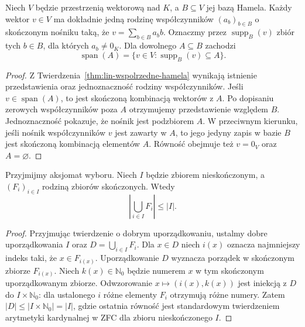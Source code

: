 \begin{lemat}
\label{lem:lin2-nosnik}
Niech \(V\) będzie przestrzenią wektorową nad \(K\),
a \(B\subseteq V\) jej bazą Hamela.
Każdy wektor \(v\in V\) ma dokładnie jedną rodzinę
współczynników \((a_b)_{b\in B}\) o skończonym nośniku
taką, że \(v=\sum_{b\in B}a_bb\).
Oznaczmy przez \(\operatorname{supp}_B(v)\) zbiór
tych \(b\in B\), dla których \(a_b\neq0_K\).
Dla dowolnego \(A\subseteq B\) zachodzi
\[
 \operatorname{span}(A)
 =\{v\in V:\operatorname{supp}_B(v)\subseteq A\}.
\]
\end{lemat}
\begin{proof}
Z Twierdzenia~\ref{thm:lin-wspolrzedne-hamela}
wynikają istnienie przedstawienia
oraz jednoznaczność rodziny współczynników.
Jeśli \(v\in\operatorname{span}(A)\), to jest skończoną
kombinacją wektorów z \(A\). Po dopisaniu zerowych współczynników
poza \(A\) otrzymujemy przedstawienie względem \(B\).
Jednoznaczność pokazuje, że nośnik jest podzbiorem \(A\).
W przeciwnym kierunku, jeśli nośnik współczynników
\(v\) jest zawarty w \(A\), to jego jedyny zapis
w bazie \(B\) jest skończoną kombinacją elementów \(A\).
Równość obejmuje też \(v=0_V\) oraz \(A=\varnothing\).
\end{proof}

\begin{lemat}
\label{lem:lin2-moce-nosnikow}
Przyjmijmy aksjomat wyboru.
Niech \(I\) będzie zbiorem nieskończonym,
a \((F_i)_{i\in I}\) rodziną zbiorów skończonych.
Wtedy
\[
 \left|\bigcup_{i\in I}F_i\right|\leq |I|.
\]
\end{lemat}
\begin{proof}
Przyjmując twierdzenie o dobrym uporządkowaniu,
ustalmy dobre uporządkowania \(I\) oraz
\(D=\bigcup_{i\in I}F_i\).
Dla \(x\in D\) niech \(i(x)\) oznacza najmniejszy indeks
taki, że \(x\in F_{i(x)}\).
Uporządkowanie \(D\) wyznacza porządek
w skończonym zbiorze \(F_{i(x)}\).
Niech \(k(x)\in\mathbb N_0\) będzie numerem \(x\)
w tym skończonym uporządkowanym zbiorze.
Odwzorowanie
\(x\mapsto(i(x),k(x))\)
jest iniekcją z \(D\) do \(I\times\mathbb N_0\):
dla ustalonego \(i\) różne elementy \(F_i\)
otrzymują różne numery.
Zatem \(|D|\leq|I\times\mathbb N_0|=|I|\),
gdzie ostatnia równość jest standardowym
twierdzeniem arytmetyki kardynalnej w ZFC
dla zbioru nieskończonego \(I\).
\end{proof}

